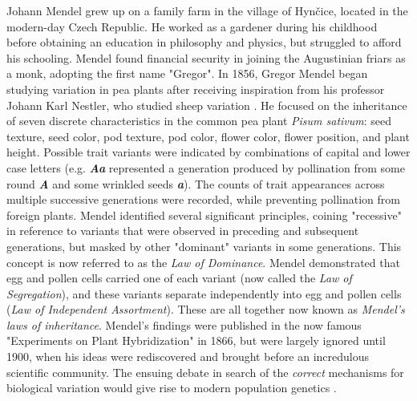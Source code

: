 Johann Mendel grew up on a family farm in the village of Hynčice, located in the modern-day Czech Republic. He worked as a gardener during his childhood before obtaining an education in philosophy and physics, but struggled to afford his schooling. Mendel found financial security in joining the Augustinian friars as a monk, adopting the first name "Gregor".  In 1856, Gregor Mendel began studying variation in pea plants after receiving inspiration from his professor Johann Karl Nestler, who studied sheep variation \cite{henig_monk_2000}. He focused on the inheritance of seven discrete characteristics in the common pea plant \textit{Pisum sativum}: seed texture, seed color, pod texture, pod color, flower color, flower position, and plant height. Possible trait variants were indicated by combinations of capital and lower case letters (e.g. \textbf{\textit{Aa}} represented a generation produced by pollination from some round \textbf{\textit{A}} and some wrinkled seeds \textbf{\textit{a}}). The counts of trait appearances across multiple successive generations were recorded, while preventing pollination from foreign plants. Mendel identified several significant principles, coining "recessive" in reference to variants that were observed in preceding and subsequent generations, but masked by other "dominant" variants in some generations. This concept is now referred to as the \textit{Law of Dominance}. Mendel demonstrated that egg and pollen cells carried one of each variant (now called the \textit{Law of Segregation}), and these variants separate independently into egg and pollen cells (\textit{Law of Independent Assortment}). These are all together now known as \textit{Mendel's laws of inheritance}. Mendel's findings were published in the now famous "Experiments on Plant Hybridization" \cite{mendel_1865} in 1866, but were largely ignored until 1900, when his ideas were rediscovered and brought before an incredulous scientific community. The ensuing debate in search of the \textit{correct} mechanisms for biological variation would give rise to modern population genetics \cite{bowler_evolution_2003}.



\newpage
